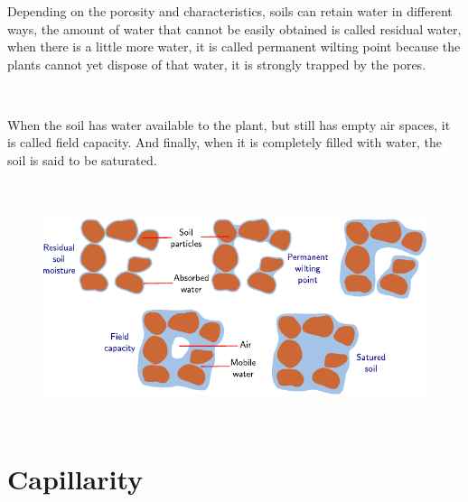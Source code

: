 \begin{frame}
	\frametitle{\secname}
	Depending on the porosity and characteristics, soils can retain
	water in different ways, the amount of water that cannot be easily
	obtained is called residual water, when there is a little more
	water, it is called \alert{permanent wilting} point because the
	plants cannot yet dispose of that water, it is strongly trapped by
	the pores.

	\

	When the soil has water available to the plant, but still has empty
	air spaces, it is called \alert{field capacity}.
	And finally, when it is completely filled with water, the soil is
	said to be \alert{saturated}.

\end{frame}
\begin{frame}
	\frametitle{\secname}
	\begin{figure}[ht!]
		\centering
		\includegraphics[height=6.8cm]{wetness}
	\end{figure}
\end{frame}

\section{Capillarity}

